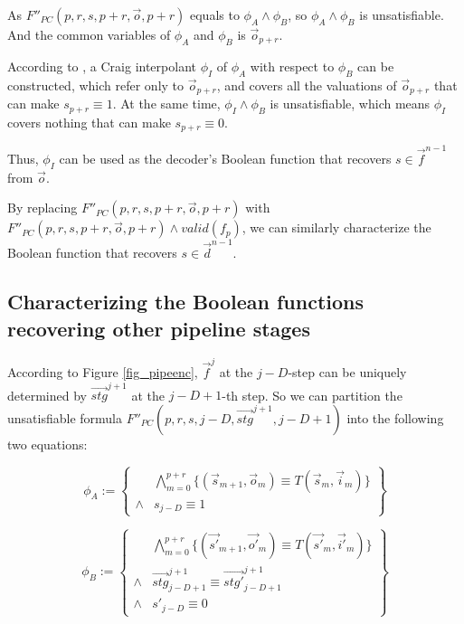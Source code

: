 \documentclass[conference]{IEEEtran}
\begin{document}
As $F''_{PC}(p,r,s,p+r,\vec{o},p+r)$ equals to $\phi_A \wedge \phi_B$,
so $\phi_A \wedge \phi_B$ is unsatisfiable.
And the common variables of $\phi_A$ and $\phi_B$ is $\vec{o}_{p+r}$.

According to \cite{InterpBoolFunction},
a Craig interpolant $\phi_I$ of $\phi_A$ with respect to $\phi_B$ can be constructed,
which refer only to $\vec{o}_{p+r}$,
and covers all the valuations of $\vec{o}_{p+r}$ that can make $s_{p+r}\equiv 1$.
At the same time,
$\phi_I\wedge \phi_B$ is unsatisfiable,
which means $\phi_I$ covers nothing that can make $s_{p+r}\equiv 0$.

Thus,
$\phi_I$ can be used as the decoder's Boolean function 
that recovers $s\in \vec{f}^{n-1}$ from $\vec{o}$.

By replacing $F''_{PC}(p,r,s,p+r,\vec{o},p+r)$ with $F''_{PC}(p,r,s,p+r,\vec{o},p+r)\wedge valid(f_p)$,
we can similarly characterize the Boolean function that recovers $s\in\vec{d}^{n-1}$.

\subsection{Characterizing the Boolean functions recovering other pipeline stages}
According to Figure \ref{fig_pipeenc},
$\vec{f}^j$ at the $j-D$-step can be uniquely determined by $\vec{stg}^{j+1}$ at the $j-D+1$-th step.
So we can partition the unsatisfiable formula $F''_{PC}(p,r,s,j-D,\vec{stg}^{j+1},j-D+1)$ 
 into the following two equations:

\begin{equation}
 \phi_A := 
 \left\{
\begin{array}{cc}
&\bigwedge_{m=0}^{p+r}
\{
(\vec{s}_{m+1},\vec{o}_m)\equiv T(\vec{s}_m,\vec{i}_m)
\}
\\
\wedge& s_{j-D}\equiv 1 
\end{array}
\right\}
\end{equation}

\begin{equation}
\phi_B := 
\left\{
\begin{array}{cc}
&\bigwedge_{m=0}^{p+r}
\{
(\vec{s'}_{m+1},\vec{o'}_m)\equiv T(\vec{s'}_m,\vec{i'}_m)
\}
\\
\wedge&\vec{stg}^{j+1}_{j-D+1}\equiv \vec{stg'}^{j+1}_{j-D+1} \\
\wedge& s'_{j-D}\equiv 0 
\end{array}
\right\}
\end{equation}
\end{document}
